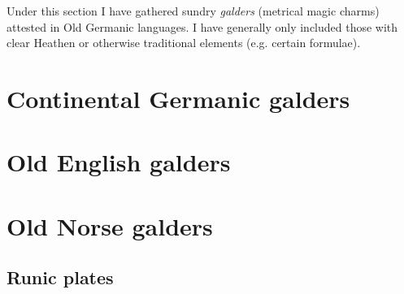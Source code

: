 Under this section I have gathered sundry \emph{galders} (metrical magic charms) attested in Old Germanic languages.  I have generally only included those with clear Heathen or otherwise traditional elements (e.g. certain formulae).


\chapter{Continental Germanic galders}





\chapter{Old English galders}

%






\chapter{Old Norse galders}






\section{Runic plates}
